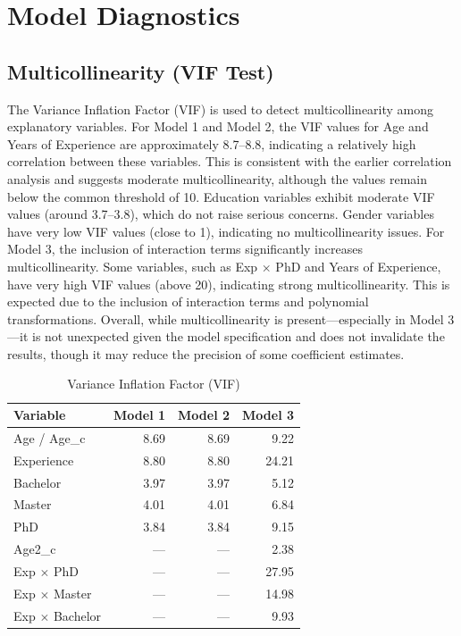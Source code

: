\documentclass[12pt, a4paper]{article}
\begin{document}
\section{Model Diagnostics}

\subsection{Multicollinearity (VIF Test)}
The Variance Inflation Factor (VIF) is used to detect multicollinearity among explanatory variables.
For Model 1 and Model 2, the VIF values for Age and Years of Experience are approximately 8.7--8.8, indicating a relatively high correlation between these variables. This is consistent with the earlier correlation analysis and suggests moderate multicollinearity, although the values remain below the common threshold of 10.
Education variables exhibit moderate VIF values (around 3.7--3.8), which do not raise serious concerns. Gender variables have very low VIF values (close to 1), indicating no multicollinearity issues.
For Model 3, the inclusion of interaction terms significantly increases multicollinearity. Some variables, such as Exp \(\times\) PhD and Years of Experience, have very high VIF values (above 20), indicating strong multicollinearity. This is expected due to the inclusion of interaction terms and polynomial transformations.
Overall, while multicollinearity is present---especially in Model 3---it is not unexpected given the model specification and does not invalidate the results, though it may reduce the precision of some coefficient estimates.

\begin{table}[htpb]
\centering
\caption{Variance Inflation Factor (VIF)}
\label{tab:vif}
\begin{tabular}{lrrr}
\toprule
\textbf{Variable} & \textbf{Model 1} & \textbf{Model 2} & \textbf{Model 3} \\
\midrule
Age / Age\_c & 8.69 & 8.69 & 9.22 \\
Experience & 8.80 & 8.80 & 24.21 \\
Bachelor & 3.97 & 3.97 & 5.12 \\
Master & 4.01 & 4.01 & 6.84 \\
PhD & 3.84 & 3.84 & 9.15 \\
Age2\_c & --- & --- & 2.38 \\
Exp \(\times\) PhD & --- & --- & 27.95 \\
Exp \(\times\) Master & --- & --- & 14.98 \\
Exp \(\times\) Bachelor & --- & --- & 9.93 \\
\bottomrule
\end{tabular}
\end{table}
\end{document}
